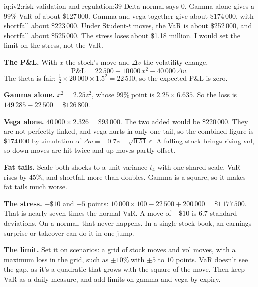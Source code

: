\begin{solution}{iq:iv2:risk-validation-and-regulation:39}
Delta-normal says 0. Gamma alone gives a 99\% VaR of about \$127\,000. Gamma and vega together give about \$174\,000, with shortfall about \$223\,000. Under Student-$t$ moves, the VaR is about \$252\,000, and shortfall about \$525\,000. The stress loses about \$1.18 million. I would set the limit on the stress, not the VaR.

\textbf{The P\&L.} With $x$ the stock's move and $\Delta v$ the volatility change,
\[
\mathrm{P\&L} = 22\,500 - 10\,000\,x^2 - 40\,000\,\Delta v.
\]
The theta is fair: $\tfrac12 \times 20\,000 \times 1.5^2 = 22\,500$, so the expected P\&L is zero.

\textbf{Gamma alone.} $x^2 = 2.25 z^2$, whose 99\% point is $2.25 \times 6.635$. So the loss is $149\,285 - 22\,500 = \$126\,800$.

\textbf{Vega alone.} $40\,000 \times 2.326 = \$93\,000$. The two added would be \$220\,000. They are not perfectly linked, and vega hurts in only one tail, so the combined figure is \$174\,000 by simulation of $\Delta v = -0.7 z + \sqrt{0.51}\,\varepsilon$. A falling stock brings rising vol, so down moves are hit twice and up moves partly offset.

\textbf{Fat tails.} Scale both shocks to a unit-variance $t_4$ with one shared scale. VaR rises by 45\%, and shortfall more than doubles. Gamma is a square, so it makes fat tails much worse.

\textbf{The stress.} $-\$10$ and $+5$ points: $10\,000 \times 100 - 22\,500 + 200\,000 = \$1\,177\,500$. That is nearly seven times the normal VaR. A move of $-\$10$ is 6.7 standard deviations. On a normal, that never happens. In a single-stock book, an earnings surprise or takeover can do it in one jump.

\textbf{The limit.} Set it on scenarios: a grid of stock moves and vol moves, with a maximum loss in the grid, such as $\pm 10\%$ with $\pm 5$ to $10$ points. VaR doesn't see the gap, as it's a quadratic that grows with the square of the move. Then keep VaR as a daily measure, and add limits on gamma and vega by expiry.

\end{solution}

